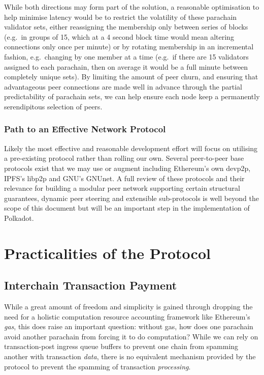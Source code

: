 \documentclass[usepdftitle=false]{beamer}
\makeatletter
\newcommand*\eg{e.g.\@\xspace}
\makeatother
\begin{document}
\begin{frame}
While both directions may form part of the solution, a reasonable optimisation to help minimise latency would be to restrict the volatility of these parachain validator sets, either reassigning the membership only between series of blocks (\eg~in groups of 15, which at a 4 second block time would mean altering connections only once per minute) or by rotating membership in an incremental fashion, \eg~changing by one member at a time (\eg~if there are 15 validators assigned to each parachain, then on average it would be a full minute between completely unique sets). By limiting the amount of peer churn, and ensuring that advantageous peer connections are made well in advance through the partial predictability of parachain sets, we can help ensure each node keep a permanently serendipitous selection of peers.

\subsubsection{Path to an Effective Network Protocol}
\label{path-to-an-effective-network-protocol}

Likely the most effective and reasonable development effort will focus on utilising a pre-existing protocol rather than rolling our own. Several peer-to-peer base protocols exist that we may use or augment including Ethereum's own devp2p\cite{devp2p}, IPFS's libp2p\cite{libp2p} and GNU's GNUnet\cite{bennett2002gnunet}. A full review of these protocols and their relevance for building a modular peer network supporting certain structural guarantees, dynamic peer steering and extensible sub-protocols is well beyond the scope of this document but will be an important step in the implementation of Polkadot.

\section{Practicalities of the Protocol}
\label{practicalities-of-the-protocol}

\subsection{Interchain Transaction Payment}

While a great amount of freedom and simplicity is gained through dropping the need for a holistic computation resource accounting framework like Ethereum's \textit{gas}, this does raise an important question: without gas, how does one parachain avoid another parachain from forcing it to do computation? While we can rely on transaction-post ingress queue buffers to prevent one chain from spamming another with transaction \textit{data}, there is no equivalent mechanism provided by the protocol to prevent the spamming of transaction \textit{processing}.


\end{frame}
\end{document}
